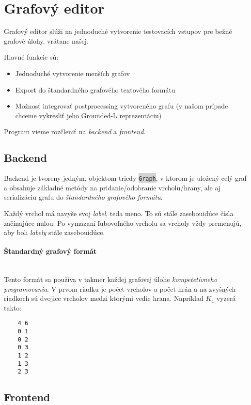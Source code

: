 \documentclass{article}
\newcommand{\code}[1]{\colorbox{lightgray}{\lstinline{#1}}}
\begin{document}
\section{Grafový editor}

Grafový editor slúži na jednoduché vytvorenie testovacích vstupov pre bežné grafové úlohy, vrátane našej. 

Hlavné funkcie sú:
\begin{itemize}
    \item Jednoduché vytvorenie menších grafov
    \item Export do štandardného grafového textového formátu
    \item Možnosť integrovať postprocessing vytvoreného grafu (v našom prípade chceme vykresliť jeho Grounded-L reprezentáciu)
\end{itemize}

Program vieme rozčleniť na \textit{backend} a \textit{frontend}.

\subsection{Backend}

Backend je tvoreny jedným, objektom triedy \code{Graph}, v ktorom je uložený celý graf a obsahuje základné metódy na pridanie/odobranie vrcholu/hrany, ale aj serializáciu grafu do \textit{štandardného grafového formátu}. 

Každý vrchol má navyše svoj \textit{label}, teda meno. To sú stále zasebouidúce čísla začínajúce nulou. Po vymazaní ľubovoľného vrcholu sa vrcholy vždy premenujú, aby boli \textit{labely} stále zasebouidúce.

\paragraph{Štandardný grafový formát}\mbox{} \\

Tento formát sa používa v takmer každej grafovej úlohe \textit{kompetetívneho programovania}.
V prvom riadku je počet vrcholov a počet hrán a na zvyšných riadkoch sú dvojice vrcholov medzi ktorými vedie hrana. Napríklad $K_4$ vyzerá takto:

\begin{verbatim}
    4 6
    0 1
    0 2
    0 3
    1 2
    1 3
    2 3
\end{verbatim}

\subsection{Frontend}
\end{document}
